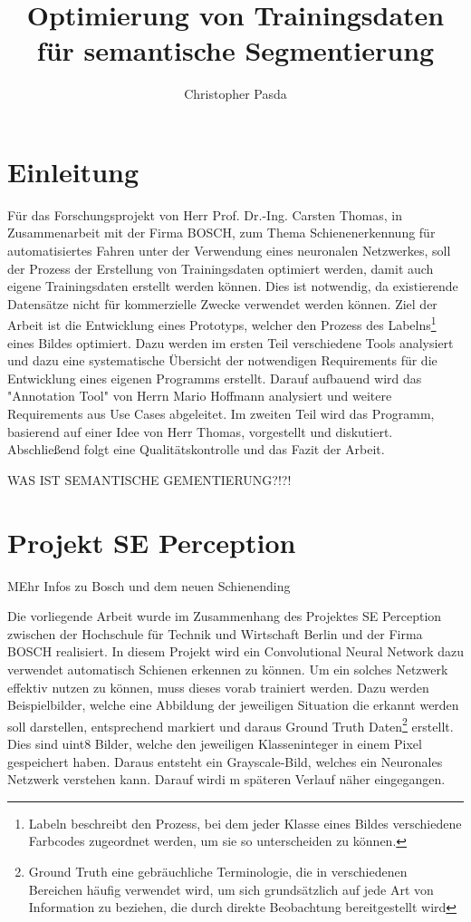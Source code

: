 \documentclass[11pt]{scrartcl}
\title{Optimierung von Trainingsdaten für semantische Segmentierung}
\author{Christopher Pasda}
\begin{document}
\maketitle
\tableofcontents

\newpage

\section{Einleitung}
\label{sec:Einleitung}

Für das Forschungsprojekt von Herr Prof. Dr.-Ing. Carsten Thomas, in Zusammenarbeit mit der Firma BOSCH, zum Thema Schienenerkennung für automatisiertes Fahren unter der Verwendung eines neuronalen Netzwerkes, soll der Prozess der Erstellung von Trainingsdaten optimiert werden, damit auch eigene Trainingsdaten erstellt werden können. Dies ist notwendig, da existierende Datensätze nicht für kommerzielle Zwecke verwendet werden können. Ziel der Arbeit ist die Entwicklung eines Prototyps, welcher den Prozess des Labelns\footnote{Labeln beschreibt den Prozess, bei dem jeder Klasse eines Bildes verschiedene Farbcodes zugeordnet werden, um sie so unterscheiden zu können.} eines Bildes optimiert.
Dazu werden im ersten Teil verschiedene Tools analysiert und dazu eine systematische
Übersicht der notwendigen Requirements für die Entwicklung eines eigenen Programms erstellt. Darauf aufbauend wird das "Annotation Tool" von Herrn Mario Hoffmann analysiert und weitere Requirements aus Use Cases abgeleitet. Im zweiten Teil wird das Programm, basierend auf einer Idee von Herr Thomas, vorgestellt und diskutiert. Abschließend folgt eine Qualitätskontrolle und das Fazit der Arbeit.

WAS IST SEMANTISCHE GEMENTIERUNG?!?!
\newpage
\section{Projekt SE Perception}
\label{sec:Projekt SE Perception}

MEhr Infos zu Bosch und dem neuen Schienending


Die vorliegende Arbeit wurde im Zusammenhang des Projektes SE Perception zwischen der Hochschule für Technik und Wirtschaft Berlin und der Firma BOSCH realisiert. In diesem Projekt wird ein Convolutional Neural Network dazu verwendet automatisch Schienen erkennen zu können. Um ein solches Netzwerk effektiv nutzen zu können, muss dieses vorab trainiert werden. Dazu werden Beispielbilder, welche eine Abbildung der jeweiligen Situation die erkannt werden soll darstellen, entsprechend markiert und daraus Ground Truth Daten\footnote{Ground Truth eine gebräuchliche Terminologie, die in verschiedenen Bereichen häufig verwendet wird, um sich grundsätzlich auf jede Art von Information zu beziehen, die durch direkte Beobachtung bereitgestellt wird} erstellt. Dies sind uint8 Bilder, welche den jeweiligen Klasseninteger in einem Pixel gespeichert haben. Daraus entsteht ein Grayscale-Bild, welches ein Neuronales Netzwerk verstehen kann. Darauf wirdi m späteren Verlauf näher eingegangen.
\end{document}
